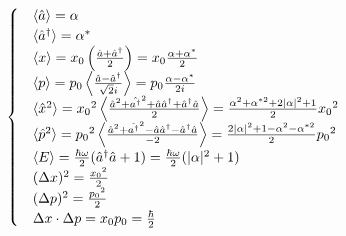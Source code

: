 \documentclass[12pt, twoside]{article}
\begin{document}
\begin{equation}
\begin{cases}

	&{ \langle \hat{a} \rangle = \alpha }\\
	&{ \langle \hat{a}^\dagger \rangle = \alpha^* }\\
	&{ \langle x \rangle = x _ { 0 } \left( \frac { \hat{a}+ \hat{a} ^ { \dagger } } { 2 } \right) = x _ { 0 } \frac{\alpha + \alpha^*}{2}}\\
	& { \langle p \rangle = p_0  \left\langle \frac { \hat{a}- \hat{a} ^ { \dagger } } { \sqrt { 2 } i } \right\rangle =  p_0 \frac{\alpha - \alpha^*}{2i} }\\
	& { \langle \hat{x}^2 \rangle = {x_0}^2  \left\langle \frac { \hat{a}^2 + \hat{a^ { \dagger }}^2 + \hat{a}\hat{a}^\dagger + \hat{a}^\dagger \hat{a} } { 2 } \right\rangle =  \frac{\alpha^2 + \alpha^{*2} + 2|\alpha|^2 + 1 }{2}{x_0}^2}\\
	& { \langle \hat{p}^2 \rangle = {p_0}^2  \left\langle \frac { \hat{a}^2 + \hat{a^ { \dagger }}^2 - \hat{a}\hat{a}^\dagger - \hat{a}^\dagger \hat{a} } { -2 } \right\rangle = \frac{ 2|\alpha|^2 + 1 -\alpha^2 - \alpha^{*2} }{2}{p_0}^2}\\
	& \expval{E} = \frac{\hbar\omega}{2}(\hat{a}^{\dagger}\hat{a}+1) = \frac{\hbar\omega}{2}(|\alpha|^2 + 1)\\
	& (\Delta x)^2 = \frac{{x_0}^2}{2}\\
	& (\Delta p)^2 = \frac{{p_0}^2}{2}\\
	& \Delta x \cdot \Delta p = x_0 p_0 = \frac{\hbar}{2} 
	
	\end{cases}\end{equation}
	
\end{document}
